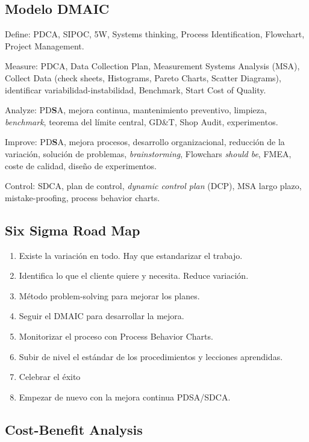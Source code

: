 \documentclass[]{article}
\begin{document}
\subsection{Modelo DMAIC}
Define: PDCA, SIPOC, 5W, Systems thinking, Process Identification, Flowchart, Project Management.

Measure: PDCA, Data Collection Plan, Measurement Systems Analysis (MSA), Collect Data (check sheets, Histograms, Pareto Charts, Scatter Diagrams), identificar variabilidad-instabilidad, Benchmark, Start Cost of Quality. 

Analyze: PD\textbf{S}A, mejora continua, mantenimiento preventivo, limpieza, \textit{benchmark}, teorema del límite central, GD\&T, Shop Audit, experimentos. 

Improve: PD\textbf{S}A, mejora procesos, desarrollo organizacional, reducción de la variación, solución de problemas, \textit{brainstorming}, Flowchars \textit{should be}, FMEA, coste de calidad, diseño de experimentos. 

Control: SDCA, plan de control, \textit{dynamic control plan} (DCP), MSA largo plazo, mistake-proofing, process behavior charts.

\subsection{Six Sigma Road Map}

\begin{enumerate}
	\item Existe la variación en todo. Hay que estandarizar el trabajo.
	\item Identifica lo que el cliente quiere y necesita. Reduce variación.
	\item Método problem-solving para mejorar los planes.
	\item Seguir el DMAIC para desarrollar la mejora.
	\item Monitorizar el proceso con Process Behavior Charts.
	\item Subir de nivel el estándar de los procedimientos y lecciones aprendidas.
	\item Celebrar el éxito
	\item Empezar de nuevo con la mejora continua PDSA/SDCA.
\end{enumerate}

\subsection{Cost-Benefit Analysis}
\end{document}
